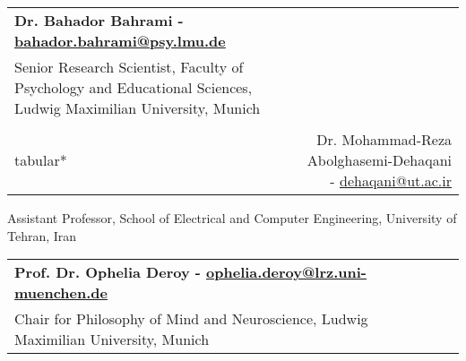 \documentclass[a4paper,10pt]{article}
\makeatletter
\newcommand{\resumeSubheading}[4]{
  \item
    \begin{tabular*}{0.98\textwidth}[t]{l@{\extracolsep{\fill}}r}
      \textbf{#1} & #2 \\
      #3 & #4 \\
    \end{tabular*}
}
\newcommand{\resumeSubHeadingListEnd}{\end{itemize}}
\newcommand{\resumeItemListStart}{\begin{itemize}\vspace{-4pt}}
\newcommand{\resumeItemListEnd}{\end{itemize}}
\makeatother
\begin{document}
\resumeSubheading
{Dr. Bahador Bahrami - \href{bbahrami@gmail.com}{bahador.bahrami@psy.lmu.de}}
{}{Senior Research Scientist, Faculty of Psychology and Educational Sciences, Ludwig Maximilian University, Munich}




\resumeSubheading
{Dr. Mohammad-Reza Abolghasemi-Dehaqani - \href{dehaqani@ut.ac.ir}{dehaqani@ut.ac.ir} }
{}{Assistant Professor, School of Electrical and Computer Engineering, University of Tehran, Iran}

\resumeSubheading
{Prof. Dr. Ophelia Deroy - \href{ophelia.deroy@lrz.uni-muenchen.de}{ophelia.deroy@lrz.uni-muenchen.de} }
{}{Chair for Philosophy of Mind and Neuroscience, Ludwig Maximilian University, Munich}


\resumeSubHeadingListEnd
\end{document}
